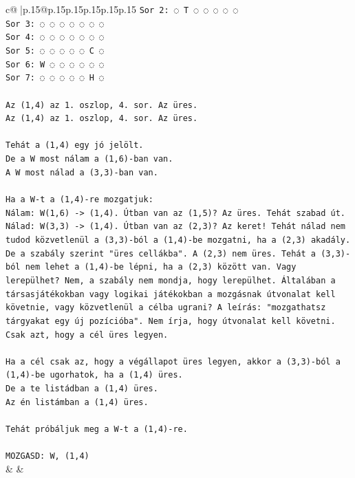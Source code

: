 \documentclass{article}
\begin{document}
{\begin{supertabular}{c@{$\;$}|p{.15\linewidth}@{}p{.15\linewidth}p{.15\linewidth}p{.15\linewidth}p{.15\linewidth}p{.15\linewidth}}
{{{\texttt{Sor 2: ◌ T ◌ ◌ ◌ ◌ ◌} \\
\texttt{Sor 3: ◌ ◌ ◌ ◌ ◌ ◌ ◌} \\
\texttt{Sor 4: ◌ ◌ ◌ ◌ ◌ ◌ ◌} \\
\texttt{Sor 5: ◌ ◌ ◌ ◌ ◌ C ◌} \\
\texttt{Sor 6: W ◌ ◌ ◌ ◌ ◌ ◌} \\
\texttt{Sor 7: ◌ ◌ ◌ ◌ ◌ H ◌} \\
\\ 
\texttt{Az (1,4) az 1. oszlop, 4. sor. Az üres.} \\
\texttt{Az (1,4) az 1. oszlop, 4. sor. Az üres.} \\
\\ 
\texttt{Tehát a (1,4) egy jó jelölt.} \\
\texttt{De a W most nálam a (1,6){-}ban van.} \\
\texttt{A W most nálad a (3,3){-}ban van.} \\
\\ 
\texttt{Ha a W{-}t a (1,4){-}re mozgatjuk:} \\
\texttt{Nálam: W(1,6) {-}> (1,4). Útban van az (1,5)? Az üres. Tehát szabad út.} \\
\texttt{Nálad: W(3,3) {-}> (1,4). Útban van az (2,3)? Az keret! Tehát nálad nem tudod közvetlenül a (3,3){-}ból a (1,4){-}be mozgatni, ha a (2,3) akadály. De a szabály szerint "üres cellákba". A (2,3) nem üres. Tehát a (3,3){-}ból nem lehet a (1,4){-}be lépni, ha a (2,3) között van. Vagy lerepülhet? Nem, a szabály nem mondja, hogy lerepülhet. Általában a társasjátékokban vagy logikai játékokban a mozgásnak útvonalat kell követnie, vagy közvetlenül a célba ugrani? A leírás: "mozgathatsz tárgyakat egy új pozícióba". Nem írja, hogy útvonalat kell követni. Csak azt, hogy a cél üres legyen.} \\
\\ 
\texttt{Ha a cél csak az, hogy a végállapot üres legyen, akkor a (3,3){-}ból a (1,4){-}be ugorhatok, ha a (1,4) üres.} \\
\texttt{De a te listádban a (1,4) üres.} \\
\texttt{Az én listámban a (1,4) üres.} \\
\\ 
\texttt{Tehát próbáljuk meg a W{-}t a (1,4){-}re.} \\
\\ 
\texttt{MOZGASD: W, (1,4)} \\
            }
        }
    }
    & & \\ \\


\end{supertabular}}
\end{document}
